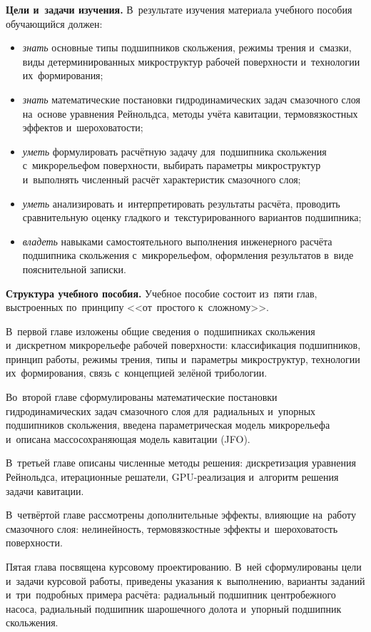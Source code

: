 \textbf{Цели и~задачи изучения.} В~результате изучения материала учебного пособия обучающийся должен:
\begin{itemize}
\item \textit{знать} основные типы подшипников скольжения, режимы трения и~смазки, виды детерминированных микроструктур рабочей поверхности и~технологии их~формирования;
\item \textit{знать} математические постановки гидродинамических задач смазочного слоя на~основе уравнения Рейнольдса, методы учёта кавитации, термовязкостных эффектов и~шероховатости;
\item \textit{уметь} формулировать расчётную задачу для~подшипника скольжения с~микрорельефом поверхности, выбирать параметры микроструктур и~выполнять численный расчёт характеристик смазочного слоя;
\item \textit{уметь} анализировать и~интерпретировать результаты расчёта, проводить сравнительную оценку гладкого и~текстурированного вариантов подшипника;
\item \textit{владеть} навыками самостоятельного выполнения инженерного расчёта подшипника скольжения с~микрорельефом, оформления результатов в~виде пояснительной записки.
\end{itemize}

\textbf{Структура учебного пособия.} Учебное пособие состоит из~пяти глав, выстроенных по~принципу <<от~простого к~сложному>>.

В~первой главе изложены общие сведения о~подшипниках скольжения и~дискретном микрорельефе рабочей поверхности: классификация подшипников, принцип работы, режимы трения, типы и~параметры микроструктур, технологии их~формирования, связь с~концепцией зелёной трибологии.

Во~второй главе сформулированы математические постановки гидродинамических задач смазочного слоя для~радиальных и~упорных подшипников скольжения, введена параметрическая модель микрорельефа и~описана массосохраняющая модель кавитации (JFO).

В~третьей главе описаны численные методы решения: дискретизация уравнения Рейнольдса, итерационные решатели, GPU-реализация и~алгоритм решения задачи кавитации.

В~четвёртой главе рассмотрены дополнительные эффекты, влияющие на~работу смазочного слоя: нелинейность, термовязкостные эффекты и~шероховатость поверхности.

Пятая глава посвящена курсовому проектированию. В~ней сформулированы цели и~задачи курсовой работы, приведены указания к~выполнению, варианты заданий и~три~подробных примера расчёта: радиальный подшипник центробежного насоса, радиальный подшипник шарошечного долота и~упорный подшипник скольжения.

